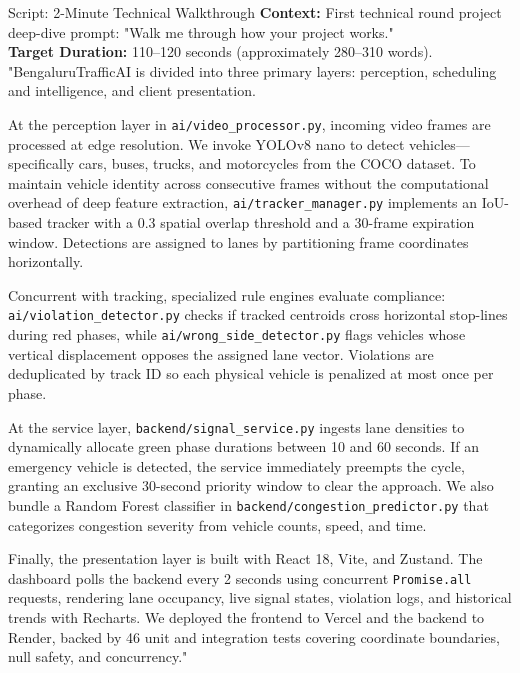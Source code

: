 \documentclass[11pt,a4paper,oneside]{report}
\begin{document}
\begin{interviewq}{Script: 2-Minute Technical Walkthrough}
\textbf{Context:} First technical round project deep-dive prompt: "Walk me through how your project works."\\
\textbf{Target Duration:} 110--120 seconds (approximately 280--310 words).
\tcblower
"BengaluruTrafficAI is divided into three primary layers: perception, scheduling and intelligence, and client presentation.

At the perception layer in \texttt{ai/video\_processor.py}, incoming video frames are processed at edge resolution. We invoke YOLOv8 nano to detect vehicles---specifically cars, buses, trucks, and motorcycles from the COCO dataset. To maintain vehicle identity across consecutive frames without the computational overhead of deep feature extraction, \texttt{ai/tracker\_manager.py} implements an IoU-based tracker with a 0.3 spatial overlap threshold and a 30-frame expiration window. Detections are assigned to lanes by partitioning frame coordinates horizontally.

Concurrent with tracking, specialized rule engines evaluate compliance: \texttt{ai/violation\_detector.py} checks if tracked centroids cross horizontal stop-lines during red phases, while \texttt{ai/wrong\_side\_detector.py} flags vehicles whose vertical displacement opposes the assigned lane vector. Violations are deduplicated by track ID so each physical vehicle is penalized at most once per phase.

At the service layer, \texttt{backend/signal\_service.py} ingests lane densities to dynamically allocate green phase durations between 10 and 60 seconds. If an emergency vehicle is detected, the service immediately preempts the cycle, granting an exclusive 30-second priority window to clear the approach. We also bundle a Random Forest classifier in \texttt{backend/congestion\_predictor.py} that categorizes congestion severity from vehicle counts, speed, and time.

Finally, the presentation layer is built with React 18, Vite, and Zustand. The dashboard polls the backend every 2 seconds using concurrent \texttt{Promise.all} requests, rendering lane occupancy, live signal states, violation logs, and historical trends with Recharts. We deployed the frontend to Vercel and the backend to Render, backed by 46 unit and integration tests covering coordinate boundaries, null safety, and concurrency."
\end{interviewq}

\end{document}
